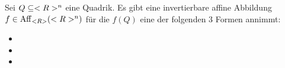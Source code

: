 \begin{conclusion}
	Sei $Q\subseteq <R>^n$ eine Quadrik. Es gibt eine invertierbare affine Abbildung $f\in\operatorname{Aff}_{<R>}(<R>^n)$ für die $f(Q)$ eine der folgenden 3 Formen annimmt:
	\begin{itemize}
		\item {}
		\item {}
		\item {}
	\end{itemize}
\end{conclusion}

